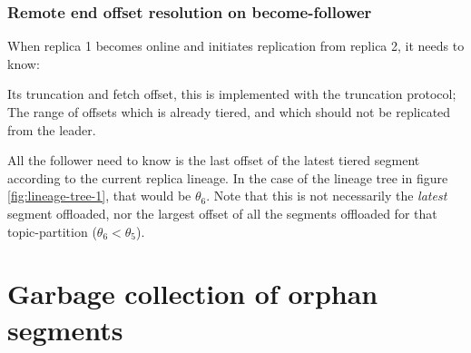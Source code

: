 \documentclass{article}
\begin{document}
\subsubsection{Remote end offset resolution on become-follower}

When replica 1 becomes online and initiates replication from replica 2, it needs to know:

\begin{outline}[enumerate]
\1 Its truncation and fetch offset, this is implemented with the truncation protocol;
\1 The range of offsets which is already tiered, and which should not be replicated from the leader.
\end{outline}


All the follower need to know is the last offset of the latest tiered segment according to the current replica lineage. In the case of the lineage tree in figure \ref{fig:lineage-tree-1}, that would be $\theta_6$. Note that this is not necessarily the \textit{latest} segment offloaded, nor the largest offset of all the segments offloaded for that topic-partition ($\theta_6 < \theta_5$).


\section{Garbage collection of orphan segments}

\newpage

{}
\end{document}

